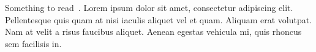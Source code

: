 \begin{summary}
Something to read~\cite{zobel2015writing}. Lorem ipsum dolor sit amet, consectetur adipiscing elit. Pellentesque quis quam at nisi iaculis aliquet vel et quam. Aliquam erat volutpat. Nam at velit a risus faucibus aliquet. Aenean egestas vehicula mi, quis rhoncus sem facilisis in.
\end{summary}
